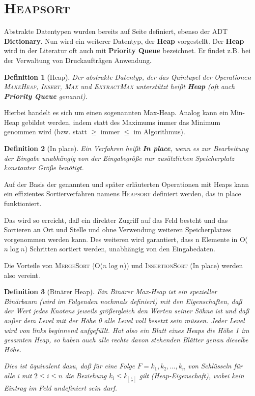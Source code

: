 \documentclass[ngerman,draft,parskip=half*,twoside]{scrreprt}
\theoremstyle{break}
\newtheorem{definition}{Definition}
\begin{document}
\section{\textsc{Heapsort}}
Abstrakte Datentypen wurden bereits auf Seite \pageref{ADT} definiert, ebenso der ADT \textbf{Dictionary}. Nun wird ein weiterer
Datentyp, der \textbf{Heap} vorgestellt. Der \textbf{Heap} wird in der Literatur oft auch mit \textbf{Priority Queue} bezeichnet.
Er findet z.B. bei der Verwaltung von Druckaufträgen Anwendung.

\begin{definition}[Heap]
Der abstrakte Datentyp, der das Quintupel der Operationen
\textsc{MakeHeap}, \textsc{Insert}, \textsc{Max} und \textsc{ExtractMax} unterstützt heißt \textbf{Heap} (oft auch \textbf{Priority Queue} genannt).
 \end{definition}

Hierbei handelt es sich um einen sogenannten Max-Heap. Analog kann ein Min-Heap gebildet werden, indem statt des Maximums immer das
Minimum genommen wird (bzw. statt $\geq$ immer $\leq$ im Algorithmus). 
% 
%
\begin{definition}[In place]
Ein Verfahren heißt \textbf{In place}, wenn es zur Bearbeitung der Eingabe unabhängig von der Eingabegröße nur zusätzlichen
Speicherplatz konstanter Größe benötigt.
\end{definition}

Auf der Basis der genannten und später erläuterten Operationen mit Heaps kann ein effizientes Sortierverfahren namens
\textsc{Heapsort} definiert werden, das in place funktioniert.

Das wird so erreicht, daß ein direkter Zugriff auf das Feld besteht und das Sortieren an Ort und Stelle und ohne Verwendung weiteren
Speicherplatzes vorgenommen werden kann. Des weiteren wird garantiert, dass n Elemente in O($n \log n$) Schritten sortiert werden,
unabhängig von den Eingabedaten.

Die Vorteile von \textsc{MergeSort} (O($n \log n$)) und \textsc{InsertionSort} (In place) werden also vereint.

\begin{definition}[Binärer Heap]
Ein \textit{Binärer Max-Heap} ist ein spezieller Binärbaum (wird im Folgenden nochmals definiert) mit den Eigenschaften, daß der
Wert jedes Knotens jeweils größergleich den Werten seiner Söhne ist und daß außer dem Level mit der Höhe 0 alle Level voll besetzt
sein müssen. Jeder Level wird von links beginnend aufgefüllt. Hat also ein Blatt eines Heaps die Höhe 1 im gesamten Heap, so haben
auch alle rechts davon stehenden Blätter genau dieselbe Höhe.

Dies ist äquivalent dazu, daß für eine Folge $F=k_{1}, k_{2}, ..., k_{n}$ von Schlüsseln 
für alle i mit $2\leq i\leq n$ die Beziehung $k_{i}\leq k_{\left\lfloor \frac{i}{2}\right\rfloor}$ gilt (Heap-Eigenschaft), wobei kein
Eintrag im Feld undefiniert sein darf.
\end{definition}
\end{document}
